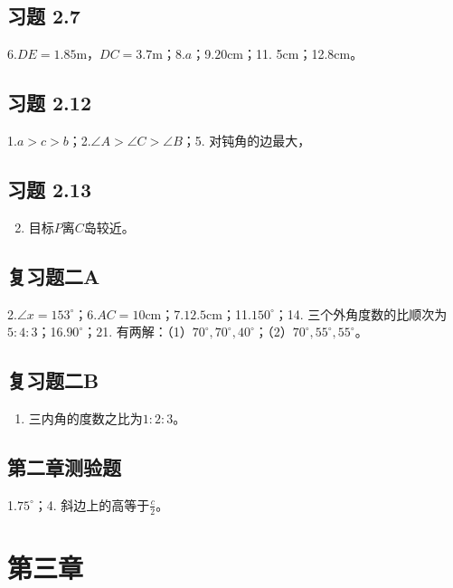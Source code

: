 \subsection{习题 2.7}

6.\(DE = 1.85\mathrm{m}\)，\(DC = 3.7\mathrm{m}\)；8.\(a\)；9.\(20\mathrm{cm}\)；11.
5cm；12.\(8\mathrm{cm}\)。

\subsection{习题 2.12}

1.\(a > c > b\)；2.\(\angle A > \angle C > \angle B\)；5.
对钝角的边最大，

\subsection{习题 2.13}

\begin{enumerate}
\setcounter{enumi}{1}
\item
  目标\(P\)离\(C\)岛较近。
\end{enumerate}

\subsection{复习题二A}

2.\(\angle x = 153^{\circ}\)；6.\(AC = 10\mathrm{cm}\)；7.\(12.5\mathrm{cm}\)；11.\(150^{\circ}\)；14.
三个外角度数的比顺次为\(5:4:3\)；16.\(90^{\circ}\)；21.
有两解：（1）\(70^{\circ}, 70^{\circ}, 40^{\circ}\)；（2）\(70^{\circ}, 55^{\circ}, 55^{\circ}\)。

\subsection{复习题二B}

\begin{enumerate}
\item
  三内角的度数之比为\(1:2:3\)。
\end{enumerate}

\subsection{第二章测验题}

1.\(75^{\circ}\)；4. 斜边上的高等于\(\frac{c}{2}\)。

\section{第三章}

